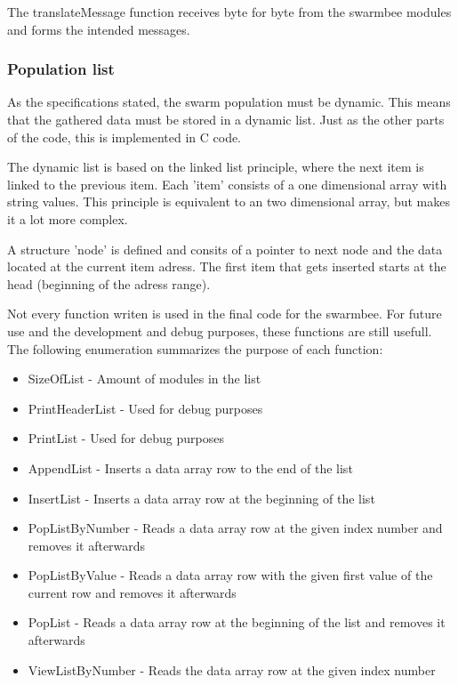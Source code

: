 \documentclass[10pt,a4paper]{article}
\begin{document}
The translateMessage function receives byte for byte from the swarmbee modules and forms the intended messages.




\subsubsection{Population list}
As the specifications stated, the swarm population must be dynamic. This means that the gathered data must be stored in a dynamic list. Just as the other parts of the code, this is implemented in C code.

The dynamic list is based on the linked list principle, where the next item is linked to the previous item. Each 'item' consists of a one dimensional array with string values. This principle is equivalent to an two dimensional array, but makes it a lot more complex. 

A structure 'node' is defined and consits of a pointer to next node and the data located at the current item adress. The first item that gets inserted starts at the head (beginning of the adress range).



Not every function writen is used in the final code for the swarmbee. For future use and the development and debug purposes, these functions are still usefull. The following enumeration summarizes the purpose of each function:
\begin{itemize}
\setlength\itemsep{0em}
    \item SizeOfList - Amount of modules in the list
    \item PrintHeaderList - Used for debug purposes
    \item PrintList - Used for debug purposes
    \item AppendList - Inserts a data array row to the end of the list
    \item InsertList - Inserts a data array row at the beginning of the list
    \item PopListByNumber - Reads a data array row at the given index number and removes it afterwards
    \item PopListByValue - Reads a data array row with the given first value of the current row and removes it afterwards
    \item PopList - Reads a data array row at the beginning of the list and removes it afterwards
    \item ViewListByNumber - Reads the data array row at the given index number
\end{itemize}
\end{document}
